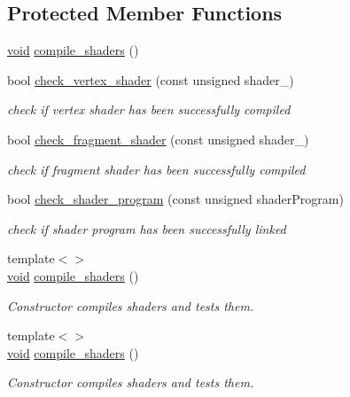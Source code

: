 \subsection*{Protected Member Functions}
\begin{DoxyCompactItemize}
\item 
\mbox{\hyperlink{glad_8h_a950fc91edb4504f62f1c577bf4727c29}{void}} \mbox{\hyperlink{classShader_a1176d69a08aef6df3b7850104871a839}{compile\+\_\+shaders}} ()
\item 
bool \mbox{\hyperlink{classShader_a6be59304dbddc46ae641e6fe6cd02938}{check\+\_\+vertex\+\_\+shader}} (const unsigned shader\+\_\+)
\begin{DoxyCompactList}\small\item\em check if vertex shader has been successfully compiled \end{DoxyCompactList}\item 
bool \mbox{\hyperlink{classShader_af80deea033a7fb48bc162b33056bd7a0}{check\+\_\+fragment\+\_\+shader}} (const unsigned shader\+\_\+)
\begin{DoxyCompactList}\small\item\em check if fragment shader has been successfully compiled \end{DoxyCompactList}\item 
bool \mbox{\hyperlink{classShader_aed672a8004b14078f149603eeb1a3f5a}{check\+\_\+shader\+\_\+program}} (const unsigned shader\+Program)
\begin{DoxyCompactList}\small\item\em check if shader program has been successfully linked \end{DoxyCompactList}\item 
{\footnotesize template$<$$>$ }\\\mbox{\hyperlink{glad_8h_a950fc91edb4504f62f1c577bf4727c29}{void}} \mbox{\hyperlink{classShader_a3ffd553eceda4e9d5a1d8b4a5a157659}{compile\+\_\+shaders}} ()
\begin{DoxyCompactList}\small\item\em Constructor compiles shaders and tests them. \end{DoxyCompactList}\item 
{\footnotesize template$<$$>$ }\\\mbox{\hyperlink{glad_8h_a950fc91edb4504f62f1c577bf4727c29}{void}} \mbox{\hyperlink{classShader_ae486635d367b6054482c56747ed74846}{compile\+\_\+shaders}} ()
\begin{DoxyCompactList}\small\item\em Constructor compiles shaders and tests them. \end{DoxyCompactList}\end{DoxyCompactItemize}
